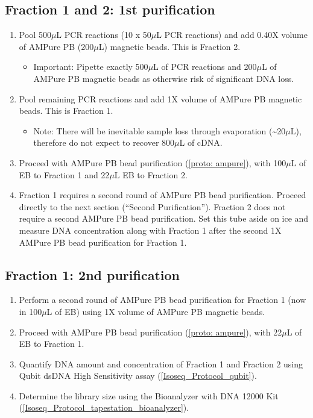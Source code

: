 \subsection{Fraction 1 and 2: 1st purification}
\begin{enumerate}
	\item Pool 500$\mu$L PCR reactions (10 x 50$\mu$L PCR reactions) and add 0.40X volume of AMPure PB (200$\mu$L) magnetic beads. This is Fraction 2.
	\begin{itemize}
		\item Important: Pipette exactly 500$\mu$L of PCR reactions and 200$\mu$L of AMPure PB magnetic beads as otherwise risk of significant DNA loss.
	\end{itemize}
	\item Pool remaining PCR reactions and add 1X volume of AMPure PB magnetic beads. This is Fraction 1. 
	\begin{itemize}
		\item Note: There will be inevitable sample loss through evaporation (\textasciitilde20$\mu$L), therefore do not expect to recover 800$\mu$L of cDNA. 
	\end{itemize}
	\item Proceed with AMPure PB bead purification (\cref{proto: ampure}), with 100$\mu$L of EB to Fraction 1 and 22$\mu$L EB to Fraction 2. 
	\item Fraction 1 requires a second round of AMPure PB bead purification. Proceed directly to the next section (“Second Purification”). Fraction 2 does not require a second AMPure PB bead purification. Set this tube aside on ice and measure DNA concentration along with Fraction 1 after the second 1X AMPure PB bead purification for Fraction 1. 
\end{enumerate}

\subsection{Fraction 1: 2nd purification}
\begin{enumerate}
	\item Perform a second round of AMPure PB bead purification for Fraction 1 (now in 100$\mu$L of EB) using 1X volume of AMPure PB magnetic beads.
	\item Proceed with AMPure PB bead purification (\cref{proto: ampure}), with 22$\mu$L of EB to Fraction 1.
	\item Quantify DNA amount and concentration of Fraction 1 and Fraction 2 using Qubit dsDNA High Sensitivity assay (\cref{Isoseq_Protocol_qubit}).
	\item Determine the library size using the Bioanalyzer with DNA 12000 Kit (\cref{Isoseq_Protocol_tapestation_bioanalyzer}). 
\end{enumerate}

